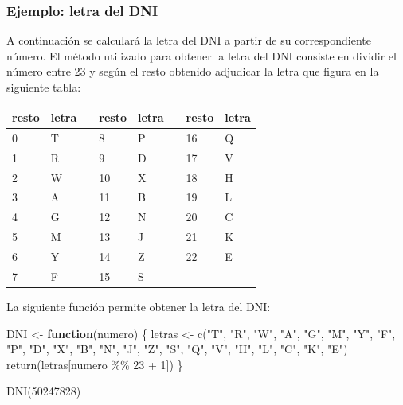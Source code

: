 \documentclass[
]{book}
\newenvironment{Shaded}{\begin{snugshade}}{\end{snugshade}}
\newcommand{\ControlFlowTok}[1]{\textcolor[rgb]{0.13,0.29,0.53}{\textbf{#1}}}
\newcommand{\DecValTok}[1]{\textcolor[rgb]{0.00,0.00,0.81}{#1}}
\newcommand{\FunctionTok}[1]{\textcolor[rgb]{0.00,0.00,0.00}{#1}}
\newcommand{\NormalTok}[1]{#1}
\newcommand{\OtherTok}[1]{\textcolor[rgb]{0.56,0.35,0.01}{#1}}
\newcommand{\SpecialCharTok}[1]{\textcolor[rgb]{0.00,0.00,0.00}{#1}}
\newcommand{\StringTok}[1]{\textcolor[rgb]{0.31,0.60,0.02}{#1}}
\theoremstyle{break}
\theoremstyle{nonumberplain}
\begin{document}
\hypertarget{ejemplo-letra-del-dni}{%
\subsubsection{Ejemplo: letra del DNI}\label{ejemplo-letra-del-dni}}

A continuación se
calculará la letra del DNI a partir de su correspondiente número. El
método utilizado para obtener la letra del DNI consiste en dividir el
número entre 23 y según el resto obtenido adjudicar la letra que figura
en la siguiente tabla:

\begin{longtable}[]{@{}llllllll@{}}
\toprule
resto & letra & & resto & letra & & resto & letra \\
\midrule
\endhead
0 & T & & 8 & P & & 16 & Q \\
1 & R & & 9 & D & & 17 & V \\
2 & W & & 10 & X & & 18 & H \\
3 & A & & 11 & B & & 19 & L \\
4 & G & & 12 & N & & 20 & C \\
5 & M & & 13 & J & & 21 & K \\
6 & Y & & 14 & Z & & 22 & E \\
7 & F & & 15 & S & & & \\
\bottomrule
\end{longtable}

La siguiente función permite obtener la letra del DNI:

\begin{Shaded}
\begin{Highlighting}[]
\NormalTok{DNI }\OtherTok{\textless{}{-}} \ControlFlowTok{function}\NormalTok{(numero) \{}
\NormalTok{  letras }\OtherTok{\textless{}{-}} \FunctionTok{c}\NormalTok{(}\StringTok{"T"}\NormalTok{, }\StringTok{"R"}\NormalTok{, }\StringTok{"W"}\NormalTok{, }\StringTok{"A"}\NormalTok{, }\StringTok{"G"}\NormalTok{, }\StringTok{"M"}\NormalTok{, }\StringTok{"Y"}\NormalTok{, }\StringTok{"F"}\NormalTok{, }
              \StringTok{"P"}\NormalTok{, }\StringTok{"D"}\NormalTok{, }\StringTok{"X"}\NormalTok{, }\StringTok{"B"}\NormalTok{, }\StringTok{"N"}\NormalTok{, }\StringTok{"J"}\NormalTok{, }\StringTok{"Z"}\NormalTok{, }\StringTok{"S"}\NormalTok{, }
              \StringTok{"Q"}\NormalTok{, }\StringTok{"V"}\NormalTok{, }\StringTok{"H"}\NormalTok{, }\StringTok{"L"}\NormalTok{, }\StringTok{"C"}\NormalTok{, }\StringTok{"K"}\NormalTok{, }\StringTok{"E"}\NormalTok{)}
  \FunctionTok{return}\NormalTok{(letras[numero }\SpecialCharTok{\%\%} \DecValTok{23} \SpecialCharTok{+} \DecValTok{1}\NormalTok{]) }
\NormalTok{\}}

\FunctionTok{DNI}\NormalTok{(}\DecValTok{50247828}\NormalTok{)}
\end{Highlighting}
\end{Shaded}
\end{document}
